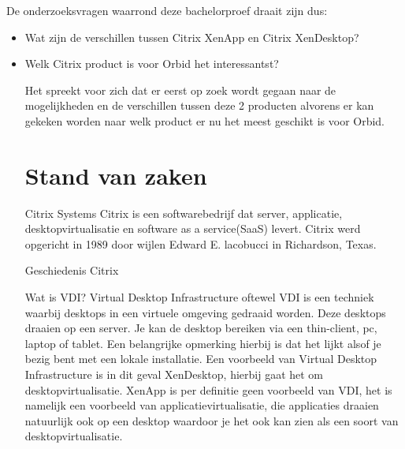 De onderzoeksvragen waarrond deze bachelorproef draait zijn dus:
\begin{itemize}
\item Wat zijn de verschillen tussen Citrix XenApp en Citrix XenDesktop?
\item Welk Citrix product is voor Orbid het interessantst?
\begin{itemize}
	
Het spreekt voor zich dat er eerst op zoek wordt gegaan naar de mogelijkheden en de verschillen tussen deze 2 producten alvorens er kan gekeken worden naar welk product er nu het meest geschikt is voor Orbid.




\section{Stand van zaken}
\label{sec:stand-van-zaken}


Citrix Systems
Citrix is een softwarebedrijf dat server, applicatie, desktopvirtualisatie en software as a service(SaaS) levert. Citrix werd opgericht in 1989 door wijlen Edward E. lacobucci in Richardson, Texas.

Geschiedenis Citrix




Wat is VDI?
Virtual Desktop Infrastructure oftewel VDI is een techniek waarbij desktops in een virtuele omgeving gedraaid worden. Deze desktops draaien op een server. Je kan de desktop bereiken via een thin-client, pc, laptop of tablet. Een belangrijke opmerking hierbij is dat het lijkt alsof je bezig bent met een lokale installatie. Een voorbeeld van Virtual Desktop Infrastructure is in dit geval XenDesktop, hierbij gaat het om desktopvirtualisatie. XenApp is per definitie geen voorbeeld van VDI, het is namelijk een voorbeeld van applicatievirtualisatie, die applicaties draaien natuurlijk ook op een desktop waardoor je het ook kan zien als een soort van desktopvirtualisatie.


\end{itemize}
\end{itemize}
